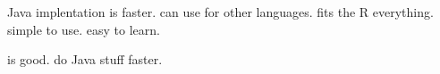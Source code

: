 Java implentation is faster.
can use for other languages.
fits the R everything.
simple to use.
easy to learn.

 is good. do Java stuff faster.



\clearpage

\nocite{*}


\address{Floid R. Gilbert\\
    Department of Statistics\\
    Brigham Young University\\
    Provo, UT 84602\\
    USA\\}

\address{David B. Dahl\\
    Department of Statistics\\
    Brigham Young University\\
    Provo, UT 84602\\
    USA\\}

